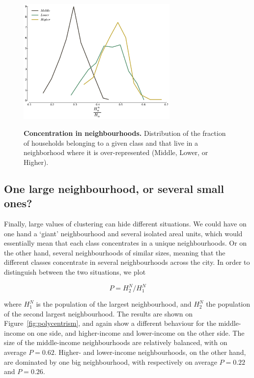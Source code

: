\begin{figure} 
    \centering
    \includegraphics[width=0.7\textwidth]{gfx/chapter-segregation/neighbourhoods_content.pdf}\\
    \caption{{\bf Concentration in neighbourhoods.} Distribution of the fraction of households belonging to a
      given class and that live in a neighborhood where it is
      over-represented (Middle, Lower, or Higher).} 
        \label{fig:content} 
\end{figure}



\subsection{One large neighbourhood, or several small ones?}
\label{sub:one_large_neighbourhood_or_several_small_ones_}

Finally, large values of clustering can hide different situations. We
could have on one hand a `giant' neighbourhood and several isolated areal units, which
would essentially mean that each class concentrates in a unique
neighbourhoods. Or on the other hand, several neighbourhoods of
similar sizes, meaning that the different classes concentrate in
several neighbourhoods across the city. In order to distinguish
between the two situations, we plot

\begin{equation} 
    P = H_{2}^N / H_{1}^N 
\end{equation}

where $H_{1}^N$ is the population of the largest neighbourhood, and $H_{2}^N$
the population of the second largest neighbourhood. The results are shown on
Figure~\ref{fig:polycentrism}, and again show a different behaviour for the
middle-income on one side, and higher-income and lower-income on the other side.
The size of the middle-income neighbourhoods are relatively balanced, with on average
$P=0.62$.  Higher- and lower-income neighbourhoods, on the other hand, are
dominated by one big neighbourhood, with respectively on average $P=0.22$ and
$P=0.26$.


